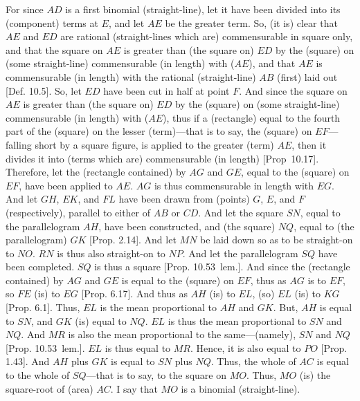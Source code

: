\begin{Parallel}{}{}
{For since $AD$ is a first binomial (straight-line), let it have been divided
into its (component) terms at $E$, and let $AE$ be the greater term.
So, (it is) clear that $AE$ and $ED$ are rational (straight-lines which are)
commensurable in square only, and that the square on $AE$ is greater
than (the square on) $ED$ by the (square) on (some straight-line)
commensurable (in length) with ($AE$), and that $AE$ is commensurable 
(in length) with
the rational (straight-line) $AB$ (first) laid out [Def. 10.5]. So, let $ED$ have been cut in half
at  point $F$. And since the square on $AE$ is greater than (the square on)
$ED$ by the (square) on (some straight-line) commensurable (in length) with ($AE$),
thus if a (rectangle) equal to the fourth part of the (square) on the lesser (term)---that is to say, the (square) on $EF$---falling short by a square figure,
is applied to the greater (term) $AE$, then it divides it into (terms which are)
commensurable (in length) [Prop~10.17]. 
Therefore, let the (rectangle contained) by $AG$ and $GE$, equal to
the (square) on $EF$, have been applied to $AE$. $AG$ 
is thus commensurable in length with $EG$. And let $GH$, $EK$, and $FL$
have been drawn from (points) $G$, $E$, and $F$ (respectively), parallel to
either of $AB$ or $CD$. And let the square $SN$, equal to the
parallelogram $AH$, have been constructed, and (the square) $NQ$,
equal to (the parallelogram) $GK$ [Prop. 2.14].
And let $MN$ be laid down so as to be straight-on to $NO$. $RN$
is thus also straight-on to $NP$. And let the parallelogram $SQ$ have
been completed. $SQ$ is thus a square [Prop. 10.53~lem.].  And since the (rectangle
contained) by $AG$ and $GE$ is equal to the (square) on $EF$, thus as
$AG$ is to $EF$, so $FE$ (is) to $EG$ [Prop. 6.17]. And thus as $AH$ (is) to
$EL$, (so) $EL$ (is) to $KG$ [Prop. 6.1]. Thus,
$EL$ is the mean proportional to $AH$ and $GK$. But, $AH$ is equal to
$SN$, and $GK$ (is) equal to $NQ$. $EL$ is thus the mean proportional
to $SN$ and $NQ$. And $MR$ is also the mean proportional to the
same---(namely), $SN$ and $NQ$ [Prop. 10.53~lem.]. $EL$ is thus equal to $MR$.
Hence, it is also equal to $PO$ [Prop. 1.43]. And
$AH$ plus $GK$ is equal to $SN$ plus $NQ$. Thus, the whole of $AC$
is equal to the whole of $SQ$---that is to say, to the square on $MO$.
Thus, $MO$ (is) the square-root of (area) $AC$.  I say that $MO$ is a
binomial (straight-line).

}
\end{Parallel}
